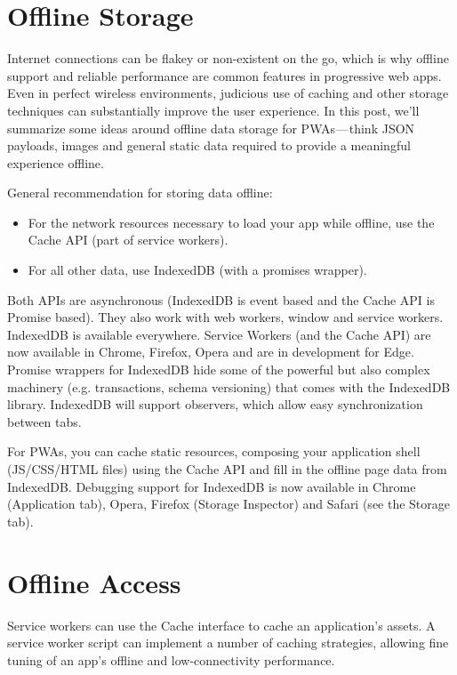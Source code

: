 \documentclass[14pt,a4paper,final]{extreport}
\begin{document}
\section{Offline Storage}
\item Internet connections can be flakey or non-existent on the go, which is why offline support and reliable performance are common features in progressive web apps. Even in perfect wireless environments, judicious use of caching and other storage techniques can substantially improve the user experience. In this post, we’ll summarize some ideas around offline data storage for PWAs — think JSON payloads, images and general static data required to provide a meaningful experience offline.
\item General recommendation for storing data offline:
\begin{itemize}
    \item For the network resources necessary to load your app while offline, use the Cache API (part of service workers).
    \item For all other data, use IndexedDB (with a promises wrapper).
\end{itemize}
\item Both APIs are asynchronous (IndexedDB is event based and the Cache API is Promise based). They also work with web workers, window and service workers. IndexedDB is available everywhere. Service Workers (and the Cache API) are now available in Chrome, Firefox, Opera and are in development for Edge. Promise wrappers for IndexedDB hide some of the powerful but also complex machinery (e.g. transactions, schema versioning) that comes with the IndexedDB library. IndexedDB will support observers, which allow easy synchronization between tabs.
\item For PWAs, you can cache static resources, composing your application shell (JS/CSS/HTML files) using the Cache API and fill in the offline page data from IndexedDB. Debugging support for IndexedDB is now available in Chrome (Application tab), Opera, Firefox (Storage Inspector) and Safari (see the Storage tab).

\section{Offline Access}
\item Service workers can use the Cache interface to cache an application's assets. A service worker script can implement a number of caching strategies, allowing fine tuning of an app's offline and low-connectivity performance.
\end{document}
